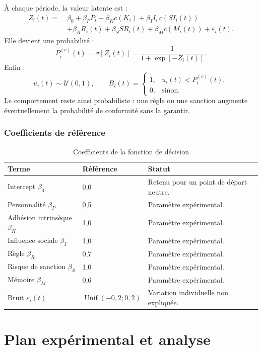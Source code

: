 \documentclass[11pt,a4paper]{article}
\begin{document}
À chaque période, la valeur latente est :
\[
\begin{aligned}
Z_i(t)=\;&\beta_0+\beta_PP_i+\beta_Kc(K_i)
+\beta_I I_i\,c(SI_i(t))\\
&+\beta_RR_i(t)+\beta_SSR_i(t)
+\beta_Mc(M_i(t))+\varepsilon_i(t).
\end{aligned}
\]
Elle devient une probabilité :
\[
P_i^{(c)}(t)=\sigma[Z_i(t)]
=\frac{1}{1+\exp[-Z_i(t)]}.
\]
Enfin :
\[
u_i(t)\sim\mathcal{U}(0,1),\qquad
B_i(t)=
\begin{cases}
1,&u_i(t)<P_i^{(c)}(t),\\
0,&\text{sinon}.
\end{cases}
\]
Le comportement reste ainsi probabiliste : une règle ou une sanction augmente
éventuellement la probabilité de conformité sans la garantir.

\subsubsection{Coefficients de référence}

\begin{table}[htbp]
\centering
\caption{Coefficients de la fonction de décision}
\label{tab:coeff}
\begin{tabularx}{\textwidth}{@{}L{37mm}C{27mm}Y@{}}
\toprule
{}
\color{white}\textbf{Terme} &
\color{white}\textbf{Référence} &
\color{white}\textbf{Statut}\\
\midrule
Intercept $\beta_0$ & 0,0 & Retenu pour un point de départ neutre.\\
Personnalité $\beta_P$ & 0,5 & Paramètre expérimental.\\
Adhésion intrinsèque $\beta_K$ & 1,0 & Paramètre expérimental.\\
Influence sociale $\beta_I$ & 1,0 & Paramètre expérimental.\\
Règle $\beta_R$ & 0,7 & Paramètre expérimental.\\
Risque de sanction $\beta_S$ & 1,0 & Paramètre expérimental.\\
Mémoire $\beta_M$ & 0,6 & Paramètre expérimental.\\
Bruit $\varepsilon_i(t)$ & $\operatorname{Unif}(-0{,}2;0{,}2)$ &
Variation individuelle non expliquée.\\
\bottomrule
\end{tabularx}
\end{table}

\section{Plan expérimental et analyse}
\end{document}
